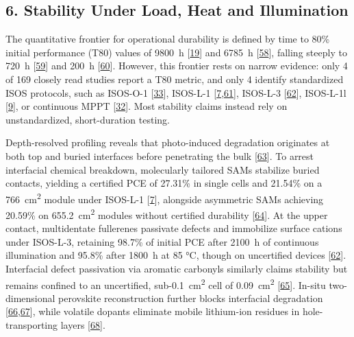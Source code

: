 \documentclass[
  11pt,
]{article}
\begin{document}
\subsection{6. Stability Under Load, Heat and
Illumination}\label{stability-under-load-heat-and-illumination}

The quantitative frontier for operational durability is defined by time
to 80\% initial performance (T80) values of \qty{9800}{\hour}
{[}\href{https://doi.org/10.1002/adma.74243}{19}{]} and
\qty{6785}{\hour} {[}\href{https://doi.org/10.1002/aenm.71317}{58}{]},
falling steeply to \qty{720}{\hour}
{[}\href{https://doi.org/10.1021/acsaem.6c01637}{59}{]} and
\qty{200}{\hour} {[}\href{https://doi.org/10.1002/smll.74531}{60}{]}.
However, this frontier rests on narrow evidence: only 4 of 169 closely
read studies report a T80 metric, and only 4 identify standardized ISOS
protocols, such as ISOS-O-1
{[}\href{https://doi.org/10.1126/sciadv.aee4175}{33}{]}, ISOS-L-1
{[}\href{https://doi.org/10.1126/sciadv.aeg1456}{7},\href{https://doi.org/10.1021/acsnano.6c04084}{61}{]},
ISOS-L-3 {[}\href{https://doi.org/10.1021/acsenergylett.6c01517}{62}{]},
ISOS-L-1l {[}\href{https://doi.org/10.1021/jacs.6c06932}{9}{]}, or
continuous MPPT
{[}\href{https://doi.org/10.26599/pom.2026.9140147}{32}{]}. Most
stability claims instead rely on unstandardized, short-duration testing.

Depth-resolved profiling reveals that photo-induced degradation
originates at both top and buried interfaces before penetrating the bulk
{[}\href{https://doi.org/10.1002/solr.70421}{63}{]}. To arrest
interfacial chemical breakdown, molecularly tailored SAMs stabilize
buried contacts, yielding a certified PCE of 27.31\% in single cells and
21.54\% on a \qty{766}{\centi\meter\squared} module under ISOS-L-1
{[}\href{https://doi.org/10.1126/sciadv.aeg1456}{7}{]}, alongside
asymmetric SAMs achieving 20.59\% on \qty{655.2}{\centi\meter\squared}
modules without certified durability
{[}\href{https://doi.org/10.1002/anie.1678852}{64}{]}. At the upper
contact, multidentate fullerenes passivate defects and immobilize
surface cations under ISOS-L-3, retaining 98.7\% of initial PCE after
\qty{2100}{\hour} of continuous illumination and 95.8\% after
\qty{1800}{\hour} at 85 °C, though on uncertified devices
{[}\href{https://doi.org/10.1021/acsenergylett.6c01517}{62}{]}.
Interfacial defect passivation via aromatic carbonyls similarly claims
stability but remains confined to an uncertified,
sub-\qty{0.1}{\centi\meter\squared} cell of
\qty{0.09}{\centi\meter\squared}
{[}\href{https://doi.org/10.1002/anie.5216345}{65}{]}. In-situ
two-dimensional perovskite reconstruction further blocks interfacial
degradation
{[}\href{https://doi.org/10.1002/adma.74247}{66},\href{https://doi.org/10.1002/solr.70447}{67}{]},
while volatile dopants eliminate mobile lithium-ion residues in
hole-transporting layers
{[}\href{https://doi.org/10.1002/smll.74289}{68}{]}.
\end{document}
